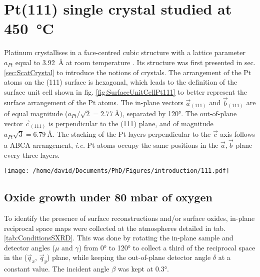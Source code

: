 \section{Pt(111) single crystal studied at \qty{450}{\degreeCelsius}} \label{sec:SXRD111}

Platinum crystallises in a face-centred cubic structure with a lattice parameter $a_{Pt}$ equal to \qty{3.92}{\angstrom} at room temperature \parencite{Waseda1975}.
Its structure was first presented in sec. \ref{sec:ScatCrystal} to introduce the notions of crystals.
The arrangement of the Pt atoms on the (111) surface is hexagonal, which leads to the definition of the surface unit cell shown in fig. \ref{fig:SurfaceUnitCellPt111} to better represent the surface arrangement of the Pt atoms.
The in-plane vectors $\vec{a}_{(111)}$ and $\vec{b}_{(111)}$ are of equal magnitude ($a_{Pt} / \sqrt{2} = \qty{2.77}{\angstrom})$, separated by \ang{120}.
The out-of-plane vector $\vec{c}_{(111)}$ is perpendicular to the (111) plane, and of magnitude $a_{Pt} \sqrt{3} = \qty{6.79}{\angstrom}$.
The stacking of the Pt layers perpendicular to the $\vec{c}$ axis follows a ABCA arrangement, \textit{i.e.} Pt atoms occupy the same positions in the $\vec{a}, \vec{b}$ plane every three layers.

\begin{SCfigure}
    \centering
    \texttt{[image: /home/david/Documents/PhD/Figures/introduction/111.pdf]}
    \caption{
        Face-centred cubic unit cell of Pt with (111) crystallographic plane drawn in green.
        $\vec{a}_{(111)}$, $\vec{b}_{(111)}$ and $\vec{c}_{(111)}$ are the $(111)$ surface unit cell vectors.
        There are three \{111\} planes spanned by the magnitude of $\vec{c}_{(111)}$ (blue, red and green on the figure).
    }
    \label{fig:SurfaceUnitCellPt111}
\end{SCfigure}

\subsection{Oxide growth under 80 mbar of oxygen}

To identify the presence of surface reconstructions and/or surface oxides, in-plane reciprocal space maps were collected at the atmospheres detailed in tab. \ref{tab:ConditionsSXRD}.
This was done by rotating the in-plane sample and detector angles ($\mu$ and $\gamma$) from \ang{0} to \ang{120} to collect a third of the reciprocal space in the ($\vec{q}_x$, $\vec{q}_y$) plane, while keeping the out-of-plane detector angle $\delta$ at a constant value.
The incident angle $\beta$ was kept at \ang{0.3}.

